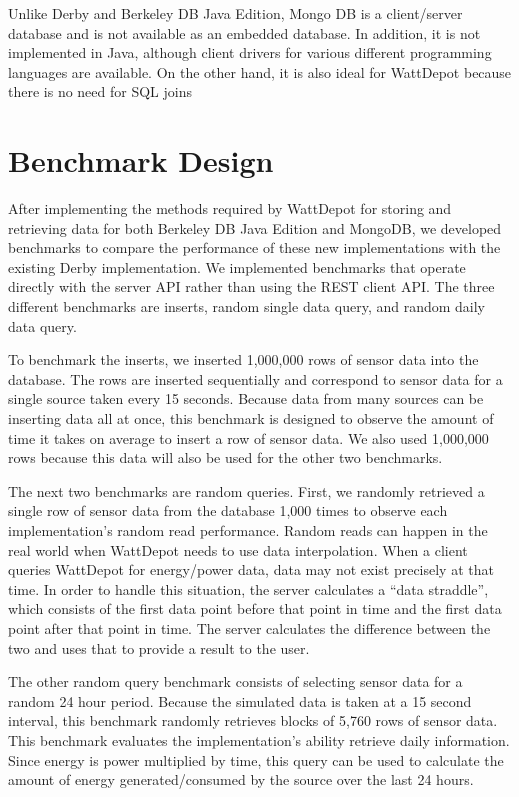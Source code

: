 \documentclass{sig-alternate}
\begin{document}
Unlike Derby and Berkeley DB Java Edition, Mongo DB is a client/server database and is not available as an embedded database.  In addition, it is not implemented in Java, although client drivers for various different programming languages are available.  On the other hand, it is also ideal for WattDepot because there is no need for SQL joins

\section{Benchmark Design}
\label{sec:benchmark}

After implementing the methods required by WattDepot for storing and retrieving data for both Berkeley DB Java Edition and MongoDB, we developed benchmarks to compare the performance of these new implementations with the existing Derby implementation.  We implemented benchmarks that operate directly with the server API rather than using the REST client API.  The three different benchmarks are inserts, random single data query, and random daily data query.

To benchmark the inserts, we inserted 1,000,000 rows of sensor data into the database.  The rows are inserted sequentially and correspond to sensor data for a single source taken every 15 seconds.  Because data from many sources can be inserting data all at once, this benchmark is designed to observe the amount of time it takes on average to insert a row of sensor data.  We also used 1,000,000 rows because this data will also be used for the other two benchmarks.

The next two benchmarks are random queries.  First, we randomly retrieved a single row of sensor data from the database 1,000 times to observe each implementation's random read performance.  Random reads can happen in the real world when WattDepot needs to use data interpolation.  When a client queries WattDepot for energy/power data, data may not exist precisely at that time.  In order to handle this situation, the server calculates a ``data straddle'', which consists of the first data point before that point in time and the first data point after that point in time.  The server calculates the difference between the two and uses that to provide a result to the user.

The other random query benchmark consists of selecting sensor data for a random 24 hour period.  Because the simulated data is taken at a 15 second interval, this benchmark randomly retrieves blocks of 5,760 rows of sensor data.  This benchmark evaluates the implementation's ability retrieve daily information.  Since energy is power multiplied by time, this query can be used to calculate the amount of energy generated/consumed by the source over the last 24 hours.
\end{document}
